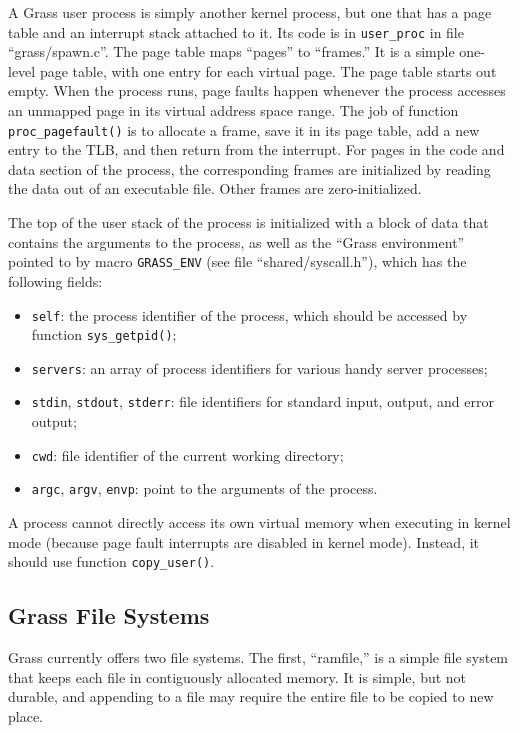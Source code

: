 \documentclass{article}
\begin{document}
A Grass user process is simply another kernel process, but one that
has a page table and an interrupt stack attached to it.
Its code is in \texttt{user\_proc} in file ``grass/spawn.c''.
The page table maps ``pages'' to ``frames.''  It is a simple one-level
page table, with one entry for each virtual page.  The page table
starts out empty.  When the process runs, page faults happen whenever
the process accesses an unmapped page in its virtual address space
range.  The job of function \texttt{proc\_pagefault()} is to allocate
a frame, save it in its page table, add a new entry to the TLB, and
then return from the interrupt.  For pages in the code and data section
of the process, the corresponding frames are initialized by reading
the data out of an executable file.  Other frames are zero-initialized.

The top of the user stack of the process is initialized with a block
of data that contains the arguments to the process, as well as the
``Grass environment'' pointed to by macro \texttt{GRASS\_ENV}
(see file ``shared/syscall.h''), which has the following fields:

\begin{itemize}
\item \texttt{self}: the process identifier of the process, which should
be accessed by function \texttt{sys\_getpid()};
\item \texttt{servers}: an array of process
identifiers for various handy server processes;
\item \texttt{stdin}, \texttt{stdout}, \texttt{stderr}: file identifiers
for standard input, output, and error output;
\item \texttt{cwd}: file identifier of the current working directory;
\item \texttt{argc}, \texttt{argv}, \texttt{envp}: point to the arguments
of the process.
\end{itemize}

A process cannot directly access its own virtual memory when executing
in kernel mode (because page fault interrupts are disabled in kernel
mode).  Instead, it should use function \texttt{copy\_user()}.

\subsection{Grass File Systems}

Grass currently offers two file systems.  The first, ``ramfile,'' 
is a simple file system that keeps each file in contiguously
allocated memory.  It is simple, but not durable, and appending
to a file may require the entire file to be copied to new place.
\end{document}
